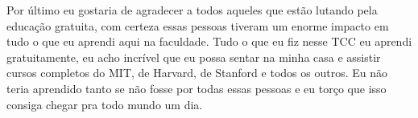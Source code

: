 \begin{agradecimentos}
Por último eu gostaria de agradecer a todos aqueles que estão lutando pela educação gratuita, com certeza essas pessoas tiveram um enorme impacto em tudo o que eu aprendi aqui na faculdade. Tudo o que eu fiz nesse TCC eu aprendi gratuitamente, eu acho incrível que eu possa sentar na minha casa e assistir cursos completos do MIT, de Harvard, de Stanford e todos os outros. Eu não teria aprendido tanto se não fosse por todas essas pessoas e eu torço que isso consiga chegar pra todo mundo um dia.

\end{agradecimentos}